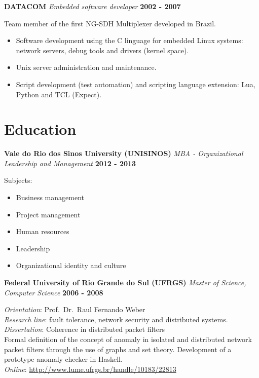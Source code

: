\documentclass[margin,line]{resume}
\providecommand{\tightlist}{\setlength{\itemsep}{0pt}\setlength{\parskip}{0pt}}
\begin{document}
\begin{resume}
    

    

    \textbf{DATACOM} \nl{}
    \textsl{Embedded software developer} \hfill \textbf{2002 - 2007}

    Team member of the first NG-SDH Multiplexer developed in Brazil.
\begin{itemize}
\tightlist
\item
  Software development using the C linguage for embedded Linux systems:
  network servers, debug tools and drivers (kernel space).
\item
  Unix server administration and maintenance.
\item
  Script development (test automation) and scripting language extension:
  Lua, Python and TCL (Expect).
\end{itemize}


    


    \section{\mysidestyle Education}

    

    

    \textbf{Vale do Rio dos Sinos University (UNISINOS)} \nl{}
    \textsl{MBA - Organizational Leadership and Management} \hfill \textbf{2012 - 2013}

    Subjects:
\begin{itemize}
\tightlist
\item
  Business management
\item
  Project management
\item
  Human resources
\item
  Leadership
\item
  Organizational identity and culture
\end{itemize}


    

    
    \clearpage
    

    \textbf{Federal University of Rio Grande do Sul (UFRGS)} \nl{}
    \textsl{Master of Science, Computer Science} \hfill \textbf{2006 - 2008}

    \emph{Orientation}: Prof.~Dr.~Raul Fernando Weber\\
\emph{Research line}: fault tolerance, network security and distributed
systems.\\
\emph{Dissertation}: Coherence in distributed packet filters\\
Formal definition of the concept of anomaly in isolated and distributed
network packet filters through the use of graphs and set theory.
Development of a prototype anomaly checker in Haskell.\\
\emph{Online}: \url{http://www.lume.ufrgs.br/handle/10183/22813}



\end{resume}
\end{document}
